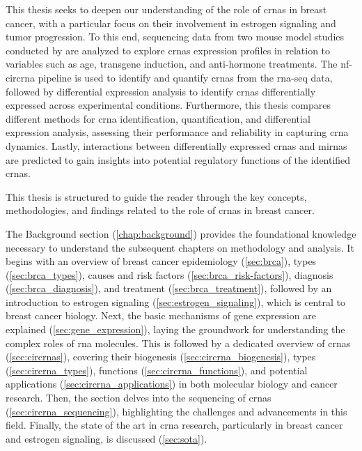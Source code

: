 This thesis seeks to deepen our understanding of the role of \glspl{crna} in
breast cancer, with a particular focus on their involvement in estrogen
signaling and tumor progression.
To this end, sequencing data from two mouse model studies conducted by
\textcite{furth_esr1_2023,furth_overexpression_2023} are analyzed to explore
\glspl{crna} expression profiles in relation to variables such as age,
transgene induction, and anti-hormone treatments.
The \gls{nf-circrna} pipeline\supercite{digby_nf-corecircrna_2023} is used to
identify and quantify \glspl{crna} from the \gls{rna-seq} data, followed by
differential expression analysis to identify \glspl{crna} differentially
expressed across experimental conditions.
Furthermore, this thesis compares different methods for \gls{crna}
identification, quantification, and differential expression analysis, assessing
their performance and reliability in capturing \gls{crna} dynamics.
Lastly, interactions between differentially expressed \glspl{crna} and
\glspl{mirna} are predicted to gain insights into potential regulatory
functions of the identified \glspl{crna}.

\medskip \noindent This thesis is structured to guide the reader through the
key concepts, methodologies, and findings related to the role of \glspl{crna}
in breast cancer.

The Background section (\cref{chap:background}) provides the foundational
knowledge necessary to understand the subsequent chapters on methodology and
analysis.
It begins with an overview of breast cancer epidemiology (\cref{sec:brca}),
types (\cref{sec:brca_types}), causes and risk factors
(\cref{sec:brca_risk-factors}), diagnosis (\cref{sec:brca_diagnosis}), and
treatment (\cref{sec:brca_treatment}), followed by an introduction to estrogen
signaling (\cref{sec:estrogen_signaling}), which is central to breast cancer
biology.
Next, the basic mechanisms of gene expression are explained
(\cref{sec:gene_expression}), laying the groundwork for understanding the
complex roles of \gls{rna} molecules.
This is followed by a dedicated overview of \glspl{crna} (\cref{sec:circrnas}),
covering their biogenesis (\cref{sec:circrna_biogenesis}), types
(\cref{sec:circrna_types}), functions (\cref{sec:circrna_functions}), and
potential applications (\cref{sec:circrna_applications}) in both molecular
biology and cancer research.
Then, the section delves into the sequencing of \glspl{crna}
(\cref{sec:circrna_sequencing}), highlighting the challenges and advancements
in this field.
Finally, the state of the art in \gls{crna} research, particularly in breast
cancer and estrogen signaling, is discussed (\cref{sec:sota}).

